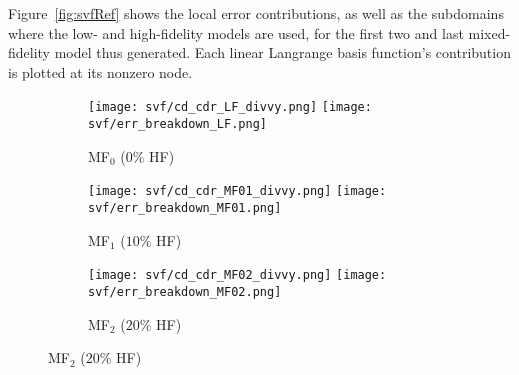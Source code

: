 Figure~\ref{fig:svfRef} shows the local error contributions, as well as the subdomains where the low- and high-fidelity models are used, for the first two and last mixed-fidelity model thus generated. Each linear Langrange basis function's contribution is plotted at its nonzero node. 
%
\begin{figure}[h]
\captionsetup[subfigure]{justification=centering,aboveskip=-10pt}
\centering
\begin{subfigure}[b]{\textwidth}
\centering
	\texttt{[image: svf/cd\_cdr\_LF\_divvy.png]}
  \texttt{[image: svf/err\_breakdown\_LF.png]}
  \vspace{-0.7\baselineskip}
  \caption{MF$_0$ ($0\%$ HF)}
  \vspace{0.8\baselineskip}
\end{subfigure}
\begin{subfigure}[b]{\textwidth}
	\centering
	\texttt{[image: svf/cd\_cdr\_MF01\_divvy.png]}
  \texttt{[image: svf/err\_breakdown\_MF01.png]}
  \vspace{-0.7\baselineskip}
  \caption{MF$_1$ ($10\%$ HF)}
  \vspace{0.8\baselineskip}
\end{subfigure}
\begin{subfigure}[b]{\textwidth}
  \centering
  \texttt{[image: svf/cd\_cdr\_MF02\_divvy.png]}
  \texttt{[image: svf/err\_breakdown\_MF02.png]}
  \vspace{-0.7\baselineskip}
  \caption{MF$_2$ ($20\%$ HF)}
  \vspace{0.8\baselineskip}
\end{subfigure}

\end{figure}
